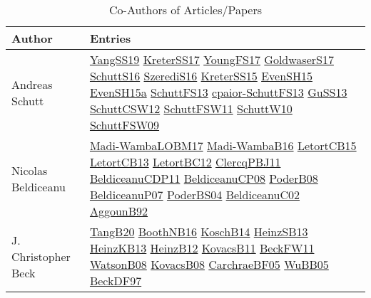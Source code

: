 {\scriptsize
\begin{longtable}{p{4cm}p{20cm}}
\caption{Co-Authors of Articles/Papers}\\ \toprule
Author & Entries \\ \midrule\endhead
\bottomrule
\endfoot
Andreas Schutt & \href{papers/YangSS19.pdf}{YangSS19}\cite{YangSS19} \href{articles/KreterSS17.pdf}{KreterSS17}\cite{KreterSS17} \href{papers/YoungFS17.pdf}{YoungFS17}\cite{YoungFS17} \href{papers/GoldwaserS17.pdf}{GoldwaserS17}\cite{GoldwaserS17} \href{papers/SchuttS16.pdf}{SchuttS16}\cite{SchuttS16} \href{papers/SzerediS16.pdf}{SzerediS16}\cite{SzerediS16} \href{papers/KreterSS15.pdf}{KreterSS15}\cite{KreterSS15} \href{papers/EvenSH15.pdf}{EvenSH15}\cite{EvenSH15} \href{articles/EvenSH15a.pdf}{EvenSH15a}\cite{EvenSH15a} \href{papers/SchuttFS13.pdf}{SchuttFS13}\cite{SchuttFS13} \href{papers/cpaior-SchuttFS13.pdf}{cpaior-SchuttFS13}\cite{cpaior-SchuttFS13} \href{papers/GuSS13.pdf}{GuSS13}\cite{GuSS13} \href{papers/SchuttCSW12.pdf}{SchuttCSW12}\cite{SchuttCSW12} \href{articles/SchuttFSW11.pdf}{SchuttFSW11}\cite{SchuttFSW11} \href{papers/SchuttW10.pdf}{SchuttW10}\cite{SchuttW10} \href{papers/SchuttFSW09.pdf}{SchuttFSW09}\cite{SchuttFSW09} \\
Nicolas Beldiceanu & \href{papers/Madi-WambaLOBM17.pdf}{Madi-WambaLOBM17}\cite{Madi-WambaLOBM17} \href{papers/Madi-WambaB16.pdf}{Madi-WambaB16}\cite{Madi-WambaB16} \href{articles/LetortCB15.pdf}{LetortCB15}\cite{LetortCB15} \href{papers/LetortCB13.pdf}{LetortCB13}\cite{LetortCB13} \href{papers/LetortBC12.pdf}{LetortBC12}\cite{LetortBC12} \href{papers/ClercqPBJ11.pdf}{ClercqPBJ11}\cite{ClercqPBJ11} \href{articles/BeldiceanuCDP11.pdf}{BeldiceanuCDP11}\cite{BeldiceanuCDP11} \href{papers/BeldiceanuCP08.pdf}{BeldiceanuCP08}\cite{BeldiceanuCP08} \href{}{PoderB08}\cite{PoderB08} \href{papers/BeldiceanuP07.pdf}{BeldiceanuP07}\cite{BeldiceanuP07} \href{articles/PoderBS04.pdf}{PoderBS04}\cite{PoderBS04} \href{papers/BeldiceanuC02.pdf}{BeldiceanuC02}\cite{BeldiceanuC02} \href{}{AggounB92}\cite{AggounB92} \\
J. Christopher Beck & \href{papers/TangB20.pdf}{TangB20}\cite{TangB20} \href{papers/BoothNB16.pdf}{BoothNB16}\cite{BoothNB16} \href{papers/KoschB14.pdf}{KoschB14}\cite{KoschB14} \href{articles/HeinzSB13.pdf}{HeinzSB13}\cite{HeinzSB13} \href{papers/HeinzKB13.pdf}{HeinzKB13}\cite{HeinzKB13} \href{papers/HeinzB12.pdf}{HeinzB12}\cite{HeinzB12} \href{articles/KovacsB11.pdf}{KovacsB11}\cite{KovacsB11} \href{}{BeckFW11}\cite{BeckFW11} \href{papers/WatsonB08.pdf}{WatsonB08}\cite{WatsonB08} \href{articles/KovacsB08.pdf}{KovacsB08}\cite{KovacsB08} \href{papers/CarchraeBF05.pdf}{CarchraeBF05}\cite{CarchraeBF05} \href{papers/WuBB05.pdf}{WuBB05}\cite{WuBB05} \href{papers/BeckDF97.pdf}{BeckDF97}\cite{BeckDF97} \\

\end{longtable}}
